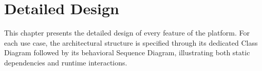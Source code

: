 \section{Detailed Design}

This chapter presents the detailed design of every feature of the platform. For each use case, the architectural structure is specified through its dedicated Class Diagram followed by its behavioral Sequence Diagram, illustrating both static dependencies and runtime interactions.


























